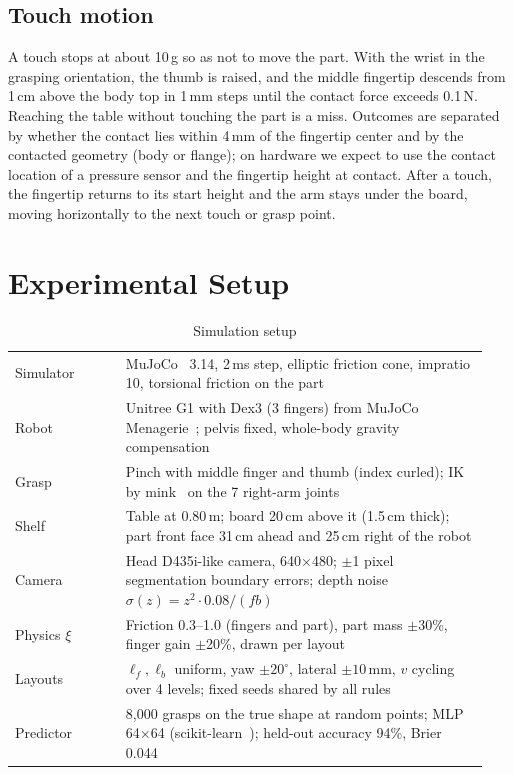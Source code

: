 \documentclass[conference]{IEEEtran}
\begin{document}
\subsection{Touch motion}\label{sec:touchmotion}
A touch stops at about 10\,g so as not to move the part. With the wrist in the grasping orientation, the thumb is raised, and the middle fingertip descends from 1\,cm above the body top in 1\,mm steps until the contact force exceeds 0.1\,N. Reaching the table without touching the part is a miss. Outcomes are separated by whether the contact lies within 4\,mm of the fingertip center and by the contacted geometry (body or flange); on hardware we expect to use the contact location of a pressure sensor and the fingertip height at contact. After a touch, the fingertip returns to its start height and the arm stays under the board, moving horizontally to the next touch or grasp point.

\section{Experimental Setup}\label{sec:setup}

\begin{table}[t]
\caption{Simulation setup}
\label{tab:setup}
\centering
\small
\begin{tabular}{@{}p{0.22\linewidth}p{0.72\linewidth}@{}}
\toprule
Simulator & MuJoCo~\cite{todorov2012mujoco} 3.14, 2\,ms step, elliptic friction cone, impratio 10, torsional friction on the part \\
Robot & Unitree G1 with Dex3 (3 fingers) from MuJoCo Menagerie~\cite{menagerie2022}; pelvis fixed, whole-body gravity compensation \\
Grasp & Pinch with middle finger and thumb (index curled); IK by mink~\cite{zakka2024mink} on the 7 right-arm joints \\
Shelf & Table at 0.80\,m; board 20\,cm above it (1.5\,cm thick); part front face 31\,cm ahead and 25\,cm right of the robot \\
Camera & Head D435i-like camera, 640$\times$480; $\pm$1 pixel segmentation boundary errors; depth noise $\sigma(z)=z^2\cdot0.08/(f b)$ \\
Physics $\xi$ & Friction 0.3--1.0 (fingers and part), part mass $\pm$30\%, finger gain $\pm$20\%, drawn per layout \\
Layouts & $\ell_f,\ell_b$ uniform, yaw $\pm20^\circ$, lateral $\pm10$\,mm, $v$ cycling over 4 levels; fixed seeds shared by all rules \\
Predictor & 8,000 grasps on the true shape at random points; MLP 64$\times$64 (scikit-learn~\cite{pedregosa2011sklearn}); held-out accuracy 94\%, Brier 0.044 \\
\bottomrule
\end{tabular}
\end{table}
\end{document}
